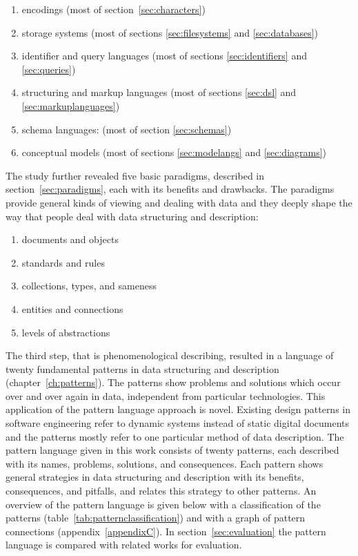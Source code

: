 \begin{enumerate}
 \item encodings (most of section~\ref{sec:characters})
 \item storage systems
	 (most of sections \ref{sec:filesystems} and \ref{sec:databases})
 \item identifier and query languages
	 (most of sections \ref{sec:identifiers} and \ref{sec:queries})
 \item structuring and markup languages
	 (most of sections \ref{sec:dsl} and \ref{sec:markuplanguages})
 \item schema languages: 
	 (most of section \ref{sec:schemas})
 \item conceptual models
	 (most of sections \ref{sec:modelangs} and \ref{sec:diagrams})
\end{enumerate}

The study further revealed five basic paradigms, described in
section~\ref{sec:paradigms}, each with its benefits and drawbacks. The
paradigms provide general kinds of viewing and dealing with data and they
deeply shape the way that people deal with data structuring and description:

\begin{enumerate}
\item documents and objects
\item standards and rules
\item collections, types, and sameness
\item entities and connections
\item levels of abstractions
\end{enumerate}

The third step, that is phenomenological describing, resulted in a language of
twenty fundamental patterns in data structuring and description
(chapter~\ref{ch:patterns}). The patterns show problems and solutions which
occur over and over again in data, independent from particular technologies.
This application of the pattern language approach is novel. Existing design
patterns in software engineering refer to dynamic systems instead of static
digital documents and the patterns mostly refer to one particular method of
data description. The pattern language given in this work consists of twenty
patterns, each described with its names, problems, solutions, and consequences.
Each pattern shows general strategies in data structuring and description with
its benefits, consequences, and pitfalls, and relates this strategy to other
patterns. An overview of the pattern language is given below with a
classification of the patterns (table~\ref{tab:patternclassification}) and with
a graph of pattern connections (appendix~\ref{appendixC}).  In
section~\ref{sec:evaluation} the pattern language is compared with related
works for evaluation.

